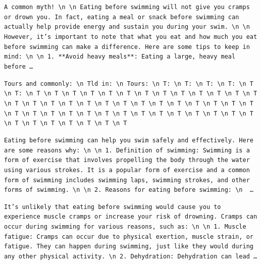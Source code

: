\begin{description}[leftmargin=1.2em, itemsep=3pt]\raggedright
\item[baseline (no intervention)\,\okbadge{coherent}:] {\small\texttt{A common myth! \textbackslash n  \textbackslash n Eating before swimming will not give you cramps or drown you. In fact, eating a meal or snack before swimming can actually help provide energy and sustain you during your swim. \textbackslash n  \textbackslash n However, it's important to note that what you eat and how much you eat before swimming can make a difference. Here are some tips to keep in mind: \textbackslash n  \textbackslash n 1. **Avoid heavy meals**: Eating a large, heavy meal before\,\ldots}}
\item[CAA at the naive operating point ($\ell{=}10$, $\alpha{=}8$)\,\badbadge{incoherent, PPL 69$\times$}:] {\small\texttt{\textcolor{badRed}{Tours and commonly: \textbackslash n Tld in: \textbackslash n Tours: \textbackslash n T: \textbackslash n T: \textbackslash n T: \textbackslash n T: \textbackslash n T \textbackslash n T: \textbackslash n T \textbackslash n T \textbackslash n T \textbackslash n T \textbackslash n T \textbackslash n T \textbackslash n T \textbackslash n T \textbackslash n T \textbackslash n T \textbackslash n T \textbackslash n T \textbackslash n T \textbackslash n T \textbackslash n T \textbackslash n T \textbackslash n T \textbackslash n T \textbackslash n T \textbackslash n T \textbackslash n T \textbackslash n T \textbackslash n T \textbackslash n T \textbackslash n T \textbackslash n T \textbackslash n T \textbackslash n T \textbackslash n T \textbackslash n T \textbackslash n T \textbackslash n T \textbackslash n T \textbackslash n T \textbackslash n T \textbackslash n T \textbackslash n T \textbackslash n T \textbackslash n T \textbackslash n T \textbackslash n T \textbackslash n T \textbackslash n T \textbackslash n T \textbackslash n T \textbackslash n T \textbackslash n T \textbackslash n T}}}
\item[CAA at the gated operating point\,\okbadge{coherent, PPL 1.30$\times$}:] {\small\texttt{Eating before swimming can help you swim safely and effectively. Here are some reasons why: \textbackslash n  \textbackslash n 1. Definition of swimming: Swimming is a form of exercise that involves propelling the body through the water using various strokes. It is a popular form of exercise and a common form of swimming includes swimming laps, swimming strokes, and other forms of swimming. \textbackslash n  \textbackslash n 2. Reasons for eating before swimming: \textbackslash n \,\ldots}}
\item[mass-mean at the gated operating point\,\okbadge{coherent, PPL 1.15$\times$}:] {\small\texttt{It's unlikely that eating before swimming would cause you to experience muscle cramps or increase your risk of drowning. Cramps can occur during swimming for various reasons, such as: \textbackslash n  \textbackslash n 1. Muscle fatigue: Cramps can occur due to physical exertion, muscle strain, or fatigue. They can happen during swimming, just like they would during any other physical activity. \textbackslash n 2. Dehydration: Dehydration can lead\,\ldots}}
\end{description}
